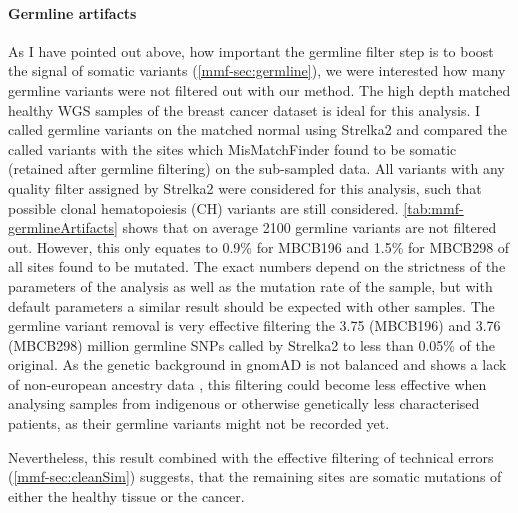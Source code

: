 \paragraph{Germline artifacts}
\label{mmf-sec:germlineArtifacts}
As I have pointed out above, how important the germline filter step is to boost the signal of somatic variants (\autoref{mmf-sec:germline}), we were interested how many germline variants were not filtered out with our method. The high depth matched healthy WGS samples of the breast cancer dataset is ideal for this analysis. I called germline variants on the matched normal using Strelka2 and compared the called variants with the sites which MisMatchFinder found to be somatic (retained after germline filtering) on the sub-sampled data.  All variants with any quality filter assigned by Strelka2 were considered for this analysis, such that possible clonal hematopoiesis (CH) variants are still considered. \autoref{tab:mmf-germlineArtifacts} shows that on average 2100 germline variants are not filtered out. However, this only equates to 0.9\% for MBCB196 and 1.5\% for MBCB298 of all sites found to be mutated. The exact numbers depend on the strictness of the parameters of the analysis as well as the mutation rate of the sample, but with default parameters a similar result should be expected with other samples. The germline variant removal is very effective filtering the 3.75 (MBCB196) and 3.76 (MBCB298) million germline SNPs called by Strelka2 to less than 0.05\% of the original. As the genetic background in gnomAD is not balanced and shows a lack of non-european ancestry data \cite{Tiao2020}, this filtering could become less effective when analysing samples from indigenous or otherwise genetically less characterised patients, as their germline variants might not be recorded yet.


Nevertheless, this result combined with the effective filtering of technical errors (\autoref{mmf-sec:cleanSim}) suggests, that the remaining sites are somatic mutations of either the healthy tissue or the cancer.

